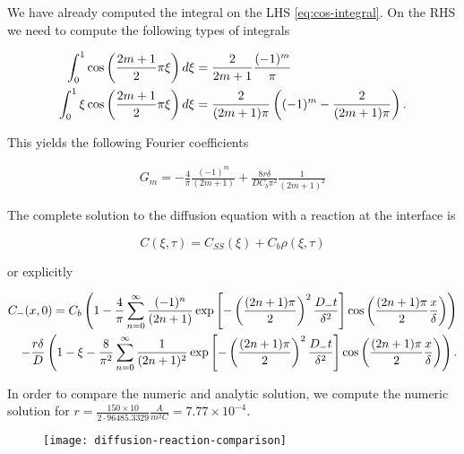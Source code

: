 We have already computed the integral on the LHS \ref{eq:cos-integral}. On the RHS we need to compute the following types of integrals

\begin{align}
	\int_0^1 \cos\left({\frac{2m+1}{2}\pi\xi}\right) d\xi &= \frac{2}{2m+1} \frac{(-1)^m}{\pi}\\
	\int_0^1 \xi \cos\left({\frac{2m+1}{2}\pi\xi}\right) d\xi &= \frac{2}{(2m+1)\pi} \left({(-1)^m -\frac{2}{(2m+1)\pi}}\right).
\end{align}

This yields the following Fourier coefficients

\begin{align}
	G_m = -\frac{4}{\pi}\frac{(-1)^m}{(2m+1)} + \frac{8r\delta}{DC_b\pi^2}\frac{1}{(2m+1)^2}
\end{align}

The complete solution to the diffusion equation with a reaction at the interface is

$$C(\xi, \tau) = C_{SS}(\xi) + C_b \rho(\xi, \tau)$$

or explicitly

\begin{align}\nonumber
	C_-(x,0) = C_b\left({1- \frac{4}{\pi} \sum_{n=0}^\infty \frac{(-1)^n}{(2n+1)}\exp\left[{-\left({\frac{(2n+1)\pi}{2}}\right)^2\frac{D_- t}{\delta^2}}\right]\cos\left({\frac{(2n+1)\pi}{2} \frac{x}{\delta}}\right)}\right)\\ -\frac{r\delta}{D}\left({1-\xi - \frac{8}{\pi^2}\sum_{n=0}^\infty \frac{1}{(2n+1)^2}\exp\left[{-\left({\frac{(2n+1)\pi}{2}}\right)^2\frac{D_- t}{\delta^2}}\right]\cos\left({\frac{(2n+1)\pi}{2} \frac{x}{\delta}}\right)}\right).
	\label{eq:solution-diffusion}
\end{align}

\newpage
In order to compare the numeric and analytic solution, we compute the numeric solution for $r = \frac{150 \times 10 }{{2 \cdot  96 485.3329 }} \frac{A}{m^2 C} = 7.77\times 10^{-4}$.



\begin{figure}[htbp]
\centering
\texttt{[image: diffusion-reaction-comparison]}
\caption{}
\label{fig:diffusion-reaction-comparison}
\end{figure}

